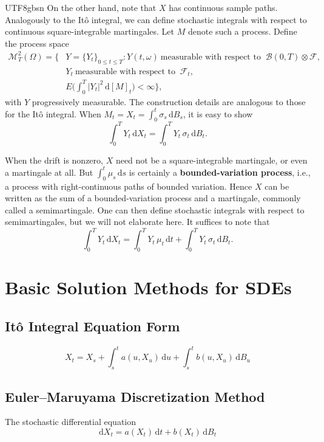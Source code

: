 \documentclass{article}
\begin{document}
\begin{CJK*}{UTF8}{gbsn}
On the other hand, note that $X$ has continuous sample paths. Analogously to the Itô integral, we can define stochastic integrals with respect to continuous square-integrable martingales. Let $M$ denote such a process. Define the process space
$$
\begin{aligned}
\mathcal{M}^2_T(\Omega)
=\Big\{&Y=\{Y_t\}_{0\le t\le T}: Y(t,\omega)\ \text{measurable with respect to }\ \mathcal{B}(0,T)\otimes\mathcal{F},\\
& Y_t\ \text{measurable with respect to }\ \mathcal{F}_t,\\
& E\!\Big(\int_0^T |Y_t|^2\,\mathrm{d}[M]_t\Big)<\infty\Big\},
\end{aligned}
$$
with $Y$ progressively measurable. The construction details are analogous to those for the Itô integral. When $M_t=X_t=\int_0^t \sigma_s\,\mathrm{d}B_s$, it is easy to show
$$
\int_0^T Y_t\,\mathrm{d}X_t=\int_0^T Y_t\,\sigma_t\,\mathrm{d}B_t.
$$

When the drift is nonzero, $X$ need not be a square-integrable martingale, or even a martingale at all. But $\int_0^t \mu_s\,\mathrm{d}s$ is certainly a \textbf{bounded-variation process}, i.e., a process with right-continuous paths of bounded variation. Hence $X$ can be written as the sum of a bounded-variation process and a martingale, commonly called a semimartingale. One can then define stochastic integrals with respect to semimartingales, but we will not elaborate here. It suffices to note that
$$
\int_0^T Y_t\,\mathrm{d}X_t=\int_0^T Y_t\,\mu_t\,\mathrm{d}t+\int_0^T Y_t\,\sigma_t\,\mathrm{d}B_t.
$$

\section{Basic Solution Methods for SDEs}
\subsection{Itô Integral Equation Form}
$$
X_t=X_s+\int_s^t a(u,X_u)\,\mathrm{d}u+\int_s^t b(u,X_u)\,\mathrm{d}B_u
$$

\subsection{Euler--Maruyama Discretization Method}
The stochastic differential equation
\begin{equation}
    \mathrm{d}X_t=a(X_t)\,\mathrm{d}t+b(X_t)\,\mathrm{d}B_t\label{eq1}
\end{equation}


\end{CJK*}
\end{document}
